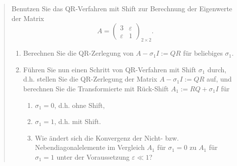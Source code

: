 \documentclass{exercise}
\begin{document}
	
	\section{}

	\begin{quote}
		Benutzen Sie das QR-Verfahren mit Shift zur Berechnung der Eigenwerte der Matrix
		\[
			A = \begin{pmatrix}
				3 & \varepsilon\\
				\varepsilon & 1
			\end{pmatrix}_{2 \times 2}.
		\]
		\begin{enumerate}
			\item Berechnen Sie die QR-Zerlegung von \(A - \sigma_1 I := QR\) für beliebiges \(\sigma_1\).
			\item Führen Sie nun einen Schritt von QR-Verfahren mit Shift \(\sigma_1\) durch, d.h. stellen Sie die QR-Zerlegung der Matrix \(A - \sigma_1 I := QR\) auf, und berechnen Sie die Transformierte mit Rück-Shift \(A_1 := RQ + \sigma_1 I\) für
			\begin{enumerate}
				\item \(\sigma_1 = 0\), d.h. ohne Shift,
				\item \(\sigma_1 = 1\), d.h. mit Shift.
				\item Wie ändert sich die Konvergenz der Nicht- bzw. Nebendiagonalelemente im Vergleich \(A_1\) für \(\sigma_1 = 0\) zu \(A_1\) für \(\sigma_1 = 1\) unter der Voraussetzung \(\varepsilon \ll 1\)?
			\end{enumerate}
		\end{enumerate}
	\end{quote}
\end{document}
